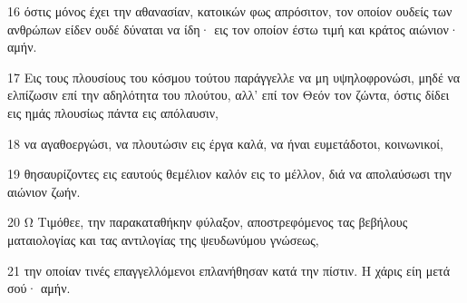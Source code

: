 \par 16 όστις μόνος έχει την αθανασίαν, κατοικών φως απρόσιτον, τον οποίον ουδείς των ανθρώπων είδεν ουδέ δύναται να ίδη· εις τον οποίον έστω τιμή και κράτος αιώνιον· αμήν.
\par 17 Εις τους πλουσίους του κόσμου τούτου παράγγελλε να μη υψηλοφρονώσι, μηδέ να ελπίζωσιν επί την αδηλότητα του πλούτου, αλλ' επί τον Θεόν τον ζώντα, όστις δίδει εις ημάς πλουσίως πάντα εις απόλαυσιν,
\par 18 να αγαθοεργώσι, να πλουτώσιν εις έργα καλά, να ήναι ευμετάδοτοι, κοινωνικοί,
\par 19 θησαυρίζοντες εις εαυτούς θεμέλιον καλόν εις το μέλλον, διά να απολαύσωσι την αιώνιον ζωήν.
\par 20 Ω Τιμόθεε, την παρακαταθήκην φύλαξον, αποστρεφόμενος τας βεβήλους ματαιολογίας και τας αντιλογίας της ψευδωνύμου γνώσεως,
\par 21 την οποίαν τινές επαγγελλόμενοι επλανήθησαν κατά την πίστιν. Η χάρις είη μετά σού· αμήν.


